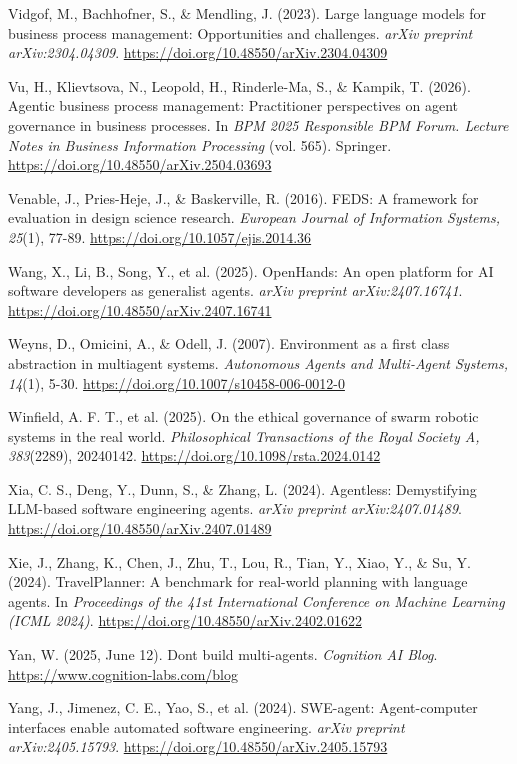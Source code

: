 \documentclass[12pt,a4paper]{article}
\begin{document}
Vidgof, M., Bachhofner, S., \& Mendling, J. (2023). Large language
models for business process management: Opportunities and challenges.
\emph{arXiv preprint arXiv:2304.04309}.
\url{https://doi.org/10.48550/arXiv.2304.04309}

Vu, H., Klievtsova, N., Leopold, H., Rinderle-Ma, S., \& Kampik, T.
(2026). Agentic business process management: Practitioner perspectives
on agent governance in business processes. In \emph{BPM 2025 Responsible
BPM Forum. Lecture Notes in Business Information Processing} (vol. 565).
Springer. \url{https://doi.org/10.48550/arXiv.2504.03693}

Venable, J., Pries-Heje, J., \& Baskerville, R. (2016). FEDS: A
framework for evaluation in design science research. \emph{European
Journal of Information Systems, 25}(1), 77-89.
\url{https://doi.org/10.1057/ejis.2014.36}

Wang, X., Li, B., Song, Y., et al. (2025). OpenHands: An open platform
for AI software developers as generalist agents. \emph{arXiv preprint
arXiv:2407.16741}. \url{https://doi.org/10.48550/arXiv.2407.16741}

Weyns, D., Omicini, A., \& Odell, J. (2007). Environment as a first
class abstraction in multiagent systems. \emph{Autonomous Agents and
Multi-Agent Systems, 14}(1), 5-30.
\url{https://doi.org/10.1007/s10458-006-0012-0}

Winfield, A. F. T., et al. (2025). On the ethical governance of swarm
robotic systems in the real world. \emph{Philosophical Transactions of
the Royal Society A, 383}(2289), 20240142.
\url{https://doi.org/10.1098/rsta.2024.0142}

Xia, C. S., Deng, Y., Dunn, S., \& Zhang, L. (2024). Agentless:
Demystifying LLM-based software engineering agents. \emph{arXiv preprint
arXiv:2407.01489}. \url{https://doi.org/10.48550/arXiv.2407.01489}

Xie, J., Zhang, K., Chen, J., Zhu, T., Lou, R., Tian, Y., Xiao, Y.,
\& Su, Y. (2024). TravelPlanner: A benchmark for real-world planning
with language agents. In \emph{Proceedings of the 41st International
Conference on Machine Learning (ICML 2024)}.
\url{https://doi.org/10.48550/arXiv.2402.01622}

Yan, W. (2025, June 12). Don\textquotesingle t build multi-agents.
\emph{Cognition AI Blog}. \url{https://www.cognition-labs.com/blog}

Yang, J., Jimenez, C. E., Yao, S., et al. (2024). SWE-agent:
Agent-computer interfaces enable automated software engineering.
\emph{arXiv preprint arXiv:2405.15793}.
\url{https://doi.org/10.48550/arXiv.2405.15793}
\end{document}

